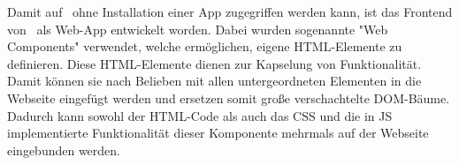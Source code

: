 \label{sec:webcomponents}

Damit auf \ZELIA\ ohne Installation einer App zugegriffen werden kann, ist das Frontend von \ZELIA\ als Web-App entwickelt worden. Dabei wurden sogenannte "Web Components" verwendet, welche ermöglichen, eigene HTML-Elemente zu definieren. Diese HTML-Elemente dienen zur Kapselung von Funktionalität. Damit können sie nach Belieben mit allen untergeordneten Elementen in die Webseite eingefügt werden und ersetzen somit große verschachtelte DOM-Bäume. Dadurch kann sowohl der HTML-Code als auch das CSS und die in JS implementierte Funktionalität dieser Komponente mehrmals auf der Webseite eingebunden werden. \cite{MDNWebCustomElements}


\pagebreak
